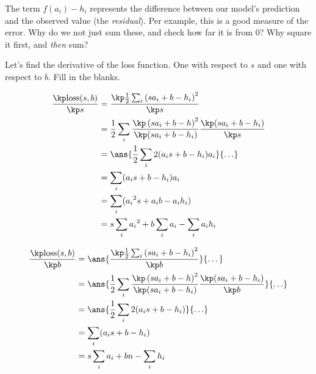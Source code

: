 \documentclass[11pt]{article}
\begin{document}
\begin{Exercise}
\noindent The term $f(a_i) - h_i$ represents the difference between our model's prediction and the observed value (the \emph{residual}). Per example, this is a good measure of the error. Why do we not just sum these, and check how far it is from 0? Why square it first, and \emph{then} sum?
\end{Exercise}


\begin{Exercise}
\noindent Let's find the derivative of the loss function. One with respect to $s$ and one with respect to $b$. Fill in the blanks.

\begin{align*}
\frac{\kp\text{loss}(s, b)}{\kp s} & = \frac{\kp \frac{1}{2} \sum_i\left (s a_i + b - h_i \right) ^2}{\kp s} \\
&= \frac{1}{2} \sum_i \frac{\kp \left (sa_i + b -h\right )^ 2}{\kp (sa_i + b -h_i)}\frac{\kp (sa_i + b -h_i)}{\kp s}\\
&= \ans{\frac{1}{2}\sum_i 2(a_is + b - h_i)a_i}{\ldots} \\	
&= \sum_i (a_is + b - h_i)a_i \\	
&= \sum_i ({a_i}^2s + a_ib - a_ih_i) \\	
&= s \sum_i {a_i}^2 + b \sum_ia_i - \sum_i a_i h_i \\	
\end{align*}

\begin{align*}
\frac{\kp\text{loss}(s, b)}{\kp b} & = \ans{\frac{\kp \frac{1}{2} \sum_i\left (s a_i + b - h_i \right) ^2}{\kp b}}{\dots} \\
&= \ans{\frac{1}{2} \sum_i \frac{\kp \left (sa_i + b -h\right )^ 2}{\kp (sa_i + b -h_i)}\frac{\kp (sa_i + b -h_i)}{\kp b}}{\ldots}\\
&= \ans{\frac{1}{2}\sum_i 2(a_is + b - h_i)}{\ldots} \\	
&= \sum_i (a_is + b - h_i) \\	
&= s \sum_i {a_i} + bn - \sum_i h_i \\	
\end{align*}
\end{Exercise}
\end{document}
